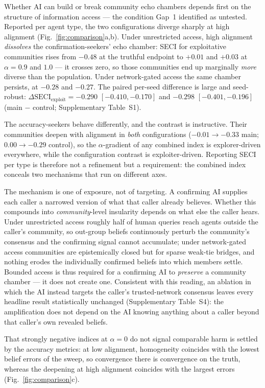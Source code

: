 \documentclass[pdflatex,sn-nature]{sn-jnl}
\begin{document}
Whether AI can build or break community echo chambers depends first on the structure of information access --- the condition Gap~1 identified as untested. Reported per agent type, the two configurations diverge sharply at high alignment (Fig.~\ref{fig:comparison}a,b). Under unrestricted access, high alignment \emph{dissolves} the confirmation-seekers' echo chamber: SECI for exploitative communities rises from $-0.48$ at the truthful endpoint to $+0.01$ and $+0.03$ at $\alpha = 0.9$ and $1.0$ --- it crosses zero, so those communities end up marginally \emph{more} diverse than the population. Under network-gated access the same chamber persists, at $-0.28$ and $-0.27$. The paired per-seed difference is large and seed-robust: $\Delta \text{SECI}_{\text{exploit}} = -0.290$ $[-0.410, -0.170]$ and $-0.298$ $[-0.401, -0.196]$ (main $-$ control; Supplementary Table~S1).

The accuracy-seekers behave differently, and the contrast is instructive. Their communities deepen with alignment in \emph{both} configurations ($-0.01 \rightarrow -0.33$ main; $0.00 \rightarrow -0.29$ control), so the $\alpha$-gradient of any combined index is explorer-driven everywhere, while the configuration contrast is exploiter-driven. Reporting SECI per type is therefore not a refinement but a requirement: the combined index conceals two mechanisms that run on different axes.

The mechanism is one of exposure, not of targeting. A confirming AI supplies each caller a narrowed version of what that caller already believes. Whether this compounds into \emph{community}-level insularity depends on what else the caller hears. Under unrestricted access roughly half of human queries reach agents outside the caller's community, so out-group beliefs continuously perturb the community's consensus and the confirming signal cannot accumulate; under network-gated access communities are epistemically closed but for sparse weak-tie bridges, and nothing erodes the individually confirmed beliefs into which members settle. Bounded access is thus required for a confirming AI to \emph{preserve} a community chamber --- it does not create one. Consistent with this reading, an ablation in which the AI instead targets the caller's trusted-network consensus leaves every headline result statistically unchanged (Supplementary Table~S4): the amplification does not depend on the AI knowing anything about a caller beyond that caller's own revealed beliefs.

That strongly negative indices at $\alpha = 0$ do not signal comparable harm is settled by the accuracy metrics: at low alignment, homogeneity coincides with the lowest belief errors of the sweep, so convergence there is convergence on the truth, whereas the deepening at high alignment coincides with the largest errors (Fig.~\ref{fig:comparison}c).
\end{document}
